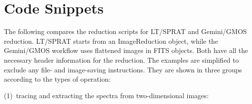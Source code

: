 \documentclass[linenumbers, twocolumn]{aastex631}
\begin{document}


\appendix
\section{Code Snippets}

The following compares the reduction scripts for LT/SPRAT and
Gemini/GMOS reduction. LT/SPRAT starts from an ImageReduction object,
while the Gemini/GMOS workflow uses flattened images in FITS objects.
Both have all the necessary header information for the reduction.
The examples are simplified to exclude any file- and image-saving
instructions. They are shown in three groups according to the types
of operation:

(1)~tracing and extracting the spectra from two-dimensional images:
\end{document}
